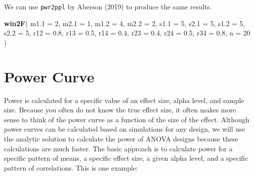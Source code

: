 \documentclass[]{book}
\newenvironment{Shaded}{\begin{snugshade}}{\end{snugshade}}
\newcommand{\DataTypeTok}[1]{\textcolor[rgb]{0.13,0.29,0.53}{#1}}
\newcommand{\DecValTok}[1]{\textcolor[rgb]{0.00,0.00,0.81}{#1}}
\newcommand{\FloatTok}[1]{\textcolor[rgb]{0.00,0.00,0.81}{#1}}
\newcommand{\KeywordTok}[1]{\textcolor[rgb]{0.13,0.29,0.53}{\textbf{#1}}}
\newcommand{\NormalTok}[1]{#1}
\begin{document}
We can use \texttt{pwr2ppl} by Aberson (2019) to produce the same results.

\begin{Shaded}
\begin{Highlighting}[]
\KeywordTok{win2F}\NormalTok{(}
  \DataTypeTok{m1.1 =} \DecValTok{2}\NormalTok{,}
  \DataTypeTok{m2.1 =} \DecValTok{1}\NormalTok{,}
  \DataTypeTok{m1.2 =} \DecValTok{4}\NormalTok{,}
  \DataTypeTok{m2.2 =} \DecValTok{2}\NormalTok{,}
  \DataTypeTok{s1.1 =} \DecValTok{5}\NormalTok{,}
  \DataTypeTok{s2.1 =} \DecValTok{5}\NormalTok{,}
  \DataTypeTok{s1.2 =} \DecValTok{5}\NormalTok{,}
  \DataTypeTok{s2.2 =} \DecValTok{5}\NormalTok{,}
  \DataTypeTok{r12 =} \FloatTok{0.8}\NormalTok{,}
  \DataTypeTok{r13 =} \FloatTok{0.5}\NormalTok{,}
  \DataTypeTok{r14 =} \FloatTok{0.4}\NormalTok{,}
  \DataTypeTok{r23 =} \FloatTok{0.4}\NormalTok{,}
  \DataTypeTok{r24 =} \FloatTok{0.5}\NormalTok{,}
  \DataTypeTok{r34 =} \FloatTok{0.8}\NormalTok{,}
  \DataTypeTok{n =} \DecValTok{20}
\NormalTok{)}
\end{Highlighting}
\end{Shaded}

\hypertarget{power-curve}{%
\chapter{Power Curve}\label{power-curve}}

Power is calculated for a specific value of an effect size, alpha level, and sample size. Because you often do not know the true effect size, it often makes more sense to think of the power curve as a function of the size of the effect. Although power curves can be calculated based on simulations for any design, we will use the analytic solution to calculate the power of ANOVA designs because these calculations are much faster. The basic approach is to calculate power for a specific pattern of means, a specific effect size, a given alpha level, and a specific pattern of correlations. This is one example:
\end{document}
